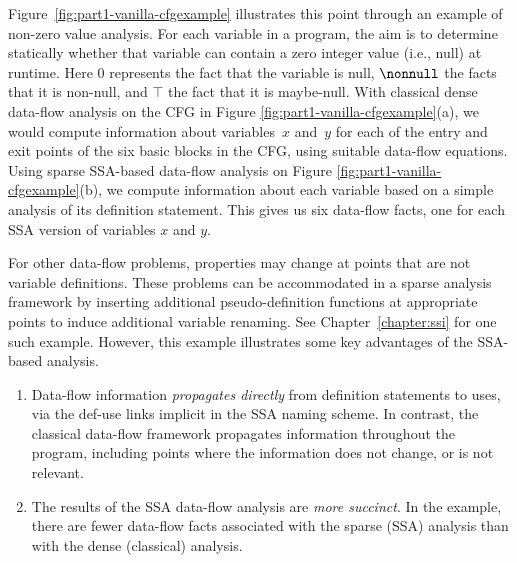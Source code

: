 Figure~\ref{fig:part1-vanilla-cfgexample} illustrates this point through an example of non-zero value analysis. For each variable in a program, the aim is to determine statically whether
that variable can contain a zero integer value (i.e., null) at runtime. Here $0$ represents the fact that the variable is null, $\nonnull$  the facts that it is non-null, and $\top$ the fact that it is maybe-null. 
With classical dense data-flow analysis on the CFG in Figure
\ref{fig:part1-vanilla-cfgexample}(a),
we would compute information about variables~$x$ and~$y$ for each of 
the entry and exit points of the six basic blocks
in the CFG, using suitable data-flow equations.
Using sparse SSA-based data-flow analysis on Figure 
\ref{fig:part1-vanilla-cfgexample}(b),
we compute information about each variable based on a simple
analysis of its definition statement. This gives us six data-flow facts,
one for each SSA version of variables $x$ and $y$.

For other data-flow problems, properties may 
change at points that are not variable definitions.
These problems can be accommodated in a sparse analysis framework
by inserting additional pseudo-definition functions at appropriate 
points
to induce additional variable renaming. 
See Chapter~\ref{chapter:ssi}
for one such example.
%
However, this example illustrates some key advantages of the SSA-based analysis.
\begin{enumerate}
\item Data-flow information
\textit{propagates directly}
from definition statements to uses, via
the def-use links implicit in the SSA naming scheme. 
In contrast, the 
classical data-flow framework 
propagates information throughout the program,
including points where the information 
does not change, or is not relevant.
\item The results of the SSA data-flow analysis are
\textit{more succinct}.
In the example, there are fewer data-flow facts associated with
the sparse (SSA) analysis than with the dense (classical) analysis.
\end{enumerate}


